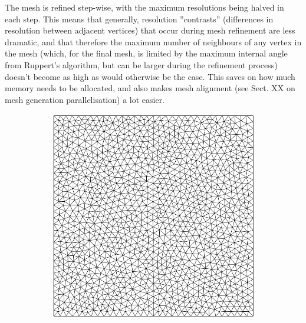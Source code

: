\documentclass{article}
\begin{document}
The mesh is refined step-wise, with the maximum resolutions being halved in each step. This means that generally, resolution ''contrasts'' (differences in resolution between adjacent vertices) that occur during mesh refinement are less dramatic, and that therefore the maximum number of neighbours of any vertex in the mesh (which, for the final mesh, is limited by the maximum internal angle from Ruppert's algorithm, but can be larger during the refinement process) doesn't become as high as would otherwise be the case. This saves on how much memory needs to be allocated, and also makes mesh alignment (see Sect. XX on mesh generation parallelisation) a lot easier.

\begin{figure}[H] \label{fig:stepwise_refinement}
  \centering
  \begin{subfigure}[b]{0.3\linewidth}
    \includegraphics[width=\linewidth]{Fig_mesh_step_01.png}
    \caption{}
  \end{subfigure}
  \begin{subfigure}[b]{0.3\linewidth}

\end{subfigure}
\end{figure}
\end{document}
